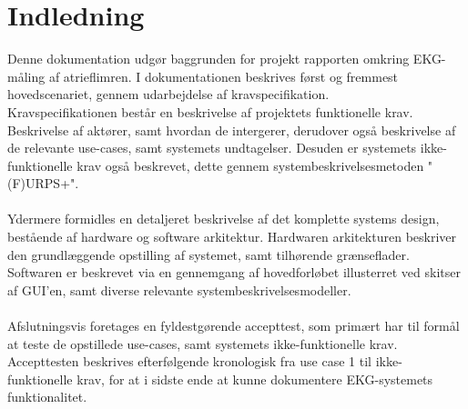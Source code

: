 \chapter{Indledning}
Denne dokumentation udgør baggrunden for projekt rapporten omkring EKG-måling af atrieflimren. I dokumentationen beskrives først og fremmest hovedscenariet, gennem udarbejdelse af kravspecifikation. \\
Kravspecifikationen består en beskrivelse af projektets funktionelle krav. Beskrivelse af aktører, samt hvordan de intergerer, derudover også beskrivelse af de relevante use-cases, samt systemets undtagelser. Desuden er systemets ikke-funktionelle krav også beskrevet, dette gennem systembeskrivelsesmetoden "(F)URPS+".\\ \\
Ydermere formidles en detaljeret beskrivelse af det komplette systems design, bestående af hardware og software arkitektur. Hardwaren arkitekturen beskriver den grundlæggende opstilling af systemet, samt tilhørende grænseflader. Softwaren er beskrevet via en gennemgang af hovedforløbet illusterret ved skitser af GUI'en, samt diverse relevante systembeskrivelsesmodeller. \\ \\
Afslutningsvis foretages en fyldestgørende accepttest, som primært har til formål at teste de opstillede use-cases, samt systemets ikke-funktionelle krav. Accepttesten beskrives efterfølgende kronologisk fra use case 1 til ikke-funktionelle krav, for at i sidste ende at kunne dokumentere EKG-systemets funktionalitet.